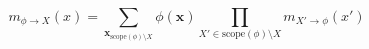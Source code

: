 $$
m_{\phi \rightarrow X}(x)
=
\sum_{\mathbf{x}_{\mathrm{scope}(\phi) \setminus X}}
\phi(\mathbf{x})
\prod_{X' \in \mathrm{scope}(\phi) \setminus X}
m_{X' \rightarrow \phi}(x')
$$
